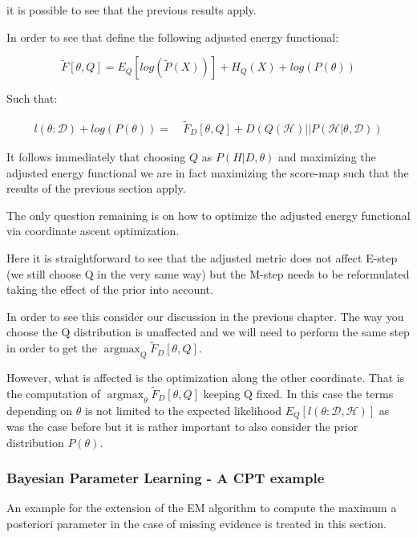 \documentclass[11pt]{article}
\begin{document}
\begin{article}
it is possible to see that the previous results apply.

In order to see that define the following adjusted energy
functional:

\begin{equation} \label{eq:adj_energy_functional}
\tilde{F}[\theta, Q] = E_Q[log (\tilde{P}(X))] + H_Q (X) + log (P(\theta)) 
\end{equation}

Such that:

\begin{align} \label{eq:adj_likelihood_energy_functional_relation}
l (\theta: \mathscr{D}) + log (P(\theta)) =& \ \tilde{F}_D[\theta, Q] + D (Q (\mathscr{H}) || P (\mathscr{H}| \theta, \mathscr{D})) 
\end{align}

It follows immediately that choosing \(Q\) as \(P (H|D, \theta)\) and
maximizing the adjusted energy functional we are in fact maximizing
the score-map such that the results of the previous section
apply. 

The only question remaining is on how to optimize the adjusted
energy functional via coordinate ascent optimization.

Here it is straightforward to see that the adjusted metric does not
affect E-step (we still choose Q in the very same way) but the
M-step needs to be reformulated taking the effect of the prior into
account.

In order to see this consider our discussion in the previous
chapter. The way you choose the Q distribution is unaffected and we
will need to perform the same step in order to get the
\(\operatorname*{argmax}_{Q} \tilde{F}_D[\theta, Q]\).

However, what is affected is the optimization along the other
coordinate. That is the computation of
\(\operatorname*{argmax}_{\theta} \tilde{F}_D[\theta, Q]\) keeping Q
fixed. In this case the terms depending on \(\theta\) is not limited to
the expected likelihood \(E_Q[l (\theta: \mathscr{D}, \mathscr{H})]\)
as was the case before but it is rather important to also consider
the prior distribution \(P(\theta)\).

\subsubsection{Bayesian Parameter Learning - A CPT example}
\label{cpt:cpt_bayes_learning}
An example for the extension of the EM algorithm to compute the
maximum a posteriori parameter in the case of missing evidence is
treated in this section.


\end{article}
\end{document}
